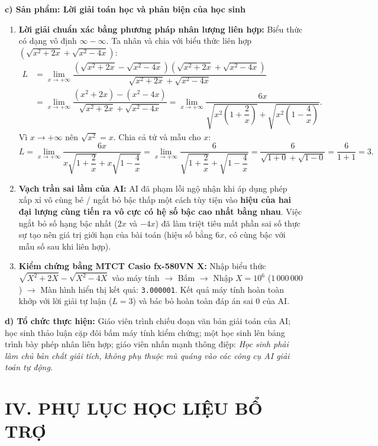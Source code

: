 \documentclass[12pt, a4paper]{article}
\begin{document}
\noindent \textbf{c) Sản phẩm: Lời giải toán học và phản biện của học sinh}
\begin{enumerate}[leftmargin=0.6cm]
    \item \textbf{Lời giải chuẩn xác bằng phương pháp nhân lượng liên hợp:}
    Biểu thức có dạng vô định $\infty - \infty$. Ta nhân và chia với biểu thức liên hợp $(\sqrt{x^2 + 2x} + \sqrt{x^2 - 4x})$:
    \begin{align*}
        L &= \lim_{x \to +\infty} \dfrac{\left(\sqrt{x^2 + 2x} - \sqrt{x^2 - 4x}\right)\left(\sqrt{x^2 + 2x} + \sqrt{x^2 - 4x}\right)}{\sqrt{x^2 + 2x} + \sqrt{x^2 - 4x}} \\
        &= \lim_{x \to +\infty} \dfrac{(x^2 + 2x) - (x^2 - 4x)}{\sqrt{x^2 + 2x} + \sqrt{x^2 - 4x}} = \lim_{x \to +\infty} \dfrac{6x}{\sqrt{x^2\left(1 + \dfrac{2}{x}\right)} + \sqrt{x^2\left(1 - \dfrac{4}{x}\right)}}.
    \end{align*}
    Vì $x \to +\infty$ nên $\sqrt{x^2} = x$. Chia cả tử và mẫu cho $x$:
    $$L = \lim_{x \to +\infty} \dfrac{6x}{x\sqrt{1 + \dfrac{2}{x}} + x\sqrt{1 - \dfrac{4}{x}}} = \lim_{x \to +\infty} \dfrac{6}{\sqrt{1 + \dfrac{2}{x}} + \sqrt{1 - \dfrac{4}{x}}} = \dfrac{6}{\sqrt{1 + 0} + \sqrt{1 - 0}} = \dfrac{6}{1 + 1} = 3.$$
    \item \textbf{Vạch trần sai lầm của AI:}
    AI đã phạm lỗi ngộ nhận khi áp dụng phép xấp xỉ vô cùng bé / ngắt bỏ bậc thấp một cách tùy tiện vào \textbf{hiệu của hai đại lượng cùng tiến ra vô cực có hệ số bậc cao nhất bằng nhau}. Việc ngắt bỏ số hạng bậc nhất ($2x$ và $-4x$) đã làm triệt tiêu mất phần sai số thực sự tạo nên giá trị giới hạn của bài toán (hiệu số bằng $6x$, có cùng bậc với mẫu số sau khi liên hợp).
    \item \textbf{Kiểm chứng bằng MTCT Casio fx-580VN X:}
    Nhập biểu thức $\sqrt{X^2 + 2X} - \sqrt{X^2 - 4X}$ vào máy tính $\to$ Bấm  $\to$ Nhập $X = 10^6$ ($1\,000\,000$) $\to$ Màn hình hiển thị kết quả: \texttt{3.000001}. Kết quả máy tính hoàn toàn khớp với lời giải tự luận ($L = 3$) và bác bỏ hoàn toàn đáp án sai $0$ của AI.
\end{enumerate}

\noindent \textbf{d) Tổ chức thực hiện:}
Giáo viên trình chiếu đoạn văn bản giải toán của AI; học sinh thảo luận cặp đôi bấm máy tính kiểm chứng; một học sinh lên bảng trình bày phép nhân liên hợp; giáo viên nhấn mạnh thông điệp: \textit{Học sinh phải làm chủ bản chất giải tích, không phụ thuộc mù quáng vào các công cụ AI giải toán tự động}.

\section*{IV. PHỤ LỤC HỌC LIỆU BỔ TRỢ}
\end{document}
